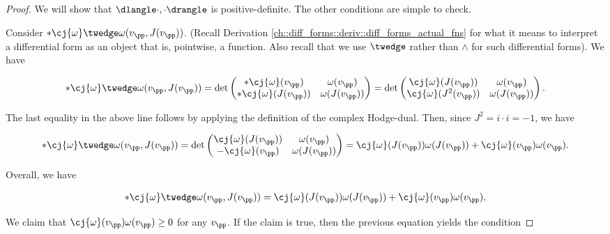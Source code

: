 \begin{proof}
    We will show that $\dlangle \cdot, \cdot \drangle$ is positive-definite. The other conditions are simple to check.
    
    Consider $*\cj{\omega} \twedge \omega(v_\pp, J(v_\pp))$. (Recall Derivation \ref{ch::diff_forms::deriv::diff_forms_actual_fns} for what it means to interpret a differential form as an object that is, pointwise, a function. Also recall that we use $\twedge$ rather than $\wedge$ for such differential forms). We have
    
    \begin{align*}
        *\cj{\omega} \twedge \omega(v_\pp, J(v_\pp))
        =
        \det 
        \begin{pmatrix}
            *\cj{\omega}(v_\pp) & \omega(v_\pp) \\
            *\cj{\omega}(J(v_\pp)) & \omega(J(v_\pp))
        \end{pmatrix}
        =
        \det 
        \begin{pmatrix}
            \cj{\omega}(J(v_\pp)) & \omega(v_\pp) \\
            \cj{\omega}(J^2(v_\pp)) & \omega(J(v_\pp))
        \end{pmatrix}.
    \end{align*}
    
    The last equality in the above line follows by applying the definition of the complex Hodge-dual. Then, since $J^2 = i \cdot i = -1$, we have
    
    \begin{align*}
       *\cj{\omega} \twedge \omega(v_\pp, J(v_\pp))
        =
        \det 
        \begin{pmatrix}
            \cj{\omega}(J(v_\pp)) & \omega(v_\pp) \\
            -\cj{\omega}(v_\pp) & \omega(J(v_\pp))
        \end{pmatrix}
        =
        \cj{\omega}(J(v_\pp)) \omega(J(v_\pp)) + \cj{\omega}(v_\pp) \omega(v_\pp).
    \end{align*}
    
    Overall, we have
    
    \begin{align*}
        *\cj{\omega} \twedge \omega(v_\pp, J(v_\pp))
        =
        \cj{\omega}(J(v_\pp)) \omega(J(v_\pp)) + \cj{\omega}(v_\pp) \omega(v_\pp).
    \end{align*}
    
    We claim that $\cj{\omega}(v_\pp) \omega(v_\pp) \geq 0$ for any $v_\pp$. If the claim is true, then the previous equation yields the condition
    

\end{proof}
